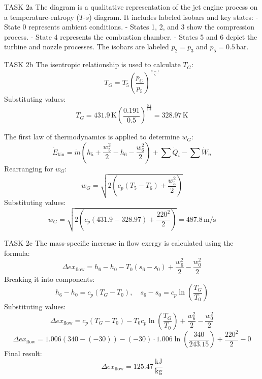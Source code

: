 TASK 2a  
The diagram is a qualitative representation of the jet engine process on a temperature-entropy (\( T \)-\( s \)) diagram. It includes labeled isobars and key states:  
- State 0 represents ambient conditions.  
- States 1, 2, and 3 show the compression process.  
- State 4 represents the combustion chamber.  
- States 5 and 6 depict the turbine and nozzle processes.  
The isobars are labeled \( p_2 = p_3 \) and \( p_5 = 0.5 \, \text{bar} \).  

TASK 2b  
The isentropic relationship is used to calculate \( T_G \):  
\[
T_G = T_5 \left( \frac{p_C}{p_5} \right)^{\frac{\kappa - 1}{\kappa}}
\]  
Substituting values:  
\[
T_G = 431.9 \, \text{K} \left( \frac{0.191}{0.5} \right)^{\frac{0.4}{1.4}} = 328.97 \, \text{K}
\]  

The first law of thermodynamics is applied to determine \( w_G \):  
\[
\dot{E}_{\text{kin}} = \dot{m} \left( h_5 + \frac{w_5^2}{2} - h_6 - \frac{w_6^2}{2} \right) + \sum \dot{Q}_i - \sum \dot{W}_n
\]  
Rearranging for \( w_G \):  
\[
w_G = \sqrt{2 \left( c_p (T_5 - T_6) + \frac{w_5^2}{2} \right)}
\]  
Substituting values:  
\[
w_G = \sqrt{2 \left( c_p (431.9 - 328.97) + \frac{220^2}{2} \right)} = 487.8 \, \text{m/s}
\]  

TASK 2c  
The mass-specific increase in flow exergy is calculated using the formula:  
\[
\Delta ex_{\text{flow}} = h_6 - h_0 - T_0 (s_6 - s_0) + \frac{w_6^2}{2} - \frac{w_0^2}{2}
\]  
Breaking it into components:  
\[
h_6 - h_0 = c_p (T_G - T_0), \quad s_6 - s_0 = c_p \ln \left( \frac{T_G}{T_0} \right)
\]  
Substituting values:  
\[
\Delta ex_{\text{flow}} = c_p (T_G - T_0) - T_0 c_p \ln \left( \frac{T_G}{T_0} \right) + \frac{w_6^2}{2} - \frac{w_0^2}{2}
\]  
\[
\Delta ex_{\text{flow}} = 1.006 \left( 340 - (-30) \right) - (-30) \cdot 1.006 \ln \left( \frac{340}{243.15} \right) + \frac{220^2}{2} - 0
\]  
Final result:  
\[
\Delta ex_{\text{flow}} = 125.47 \, \frac{\text{kJ}}{\text{kg}}
\]